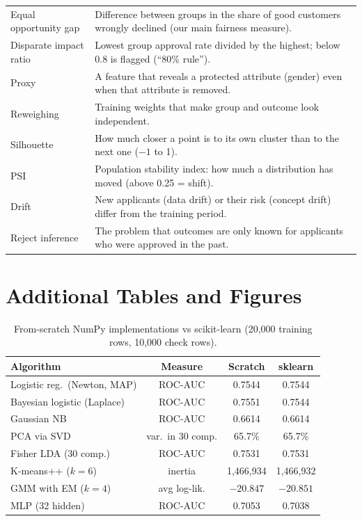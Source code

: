 \documentclass[conference,10pt]{IEEEtran}
\begin{document}
\begin{table}[!ht]
\begin{tabular}{@{}lp{13.2cm}@{}}
Equal opportunity gap & Difference between groups in the share of good customers wrongly declined (our main fairness measure). \\
Disparate impact ratio & Lowest group approval rate divided by the highest; below 0.8 is flagged (``80\% rule''). \\
Proxy & A feature that reveals a protected attribute (gender) even when that attribute is removed. \\
Reweighing & Training weights that make group and outcome look independent. \\
Silhouette & How much closer a point is to its own cluster than to the next one ($-1$ to 1). \\
PSI & Population stability index: how much a distribution has moved (above 0.25 = shift). \\
Drift & New applicants (data drift) or their risk (concept drift) differ from the training period. \\
Reject inference & The problem that outcomes are only known for applicants who were approved in the past. \\
\bottomrule
\end{tabular}
\end{table}

\section{Additional Tables and Figures}

\begin{table}[!ht]
\centering\small
\caption{From-scratch NumPy implementations vs scikit-learn (20,000 training rows, 10,000 check rows).}
\label{tab:scratch}
\footnotesize\setlength{\tabcolsep}{3pt}
\begin{tabular}{@{}lccc@{}}
\toprule
Algorithm & Measure & Scratch & sklearn \\
\midrule
Logistic reg.\ (Newton, MAP) & ROC-AUC & 0.7544 & 0.7544 \\
Bayesian logistic (Laplace) & ROC-AUC & 0.7551 & 0.7544 \\
Gaussian NB & ROC-AUC & 0.6614 & 0.6614 \\
PCA via SVD & var.\ in 30 comp. & 65.7\% & 65.7\% \\
Fisher LDA (30 comp.) & ROC-AUC & 0.7531 & 0.7531 \\
K-means++ ($k=6$) & inertia & 1,466,934 & 1,466,932 \\
GMM with EM ($k=4$) & avg log-lik. & $-20.847$ & $-20.851$ \\
MLP (32 hidden) & ROC-AUC & 0.7053 & 0.7038 \\
\bottomrule
\end{tabular}
\end{table}
\end{document}
